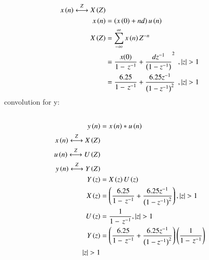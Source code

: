 \documentclass[journal,12pt,twocolumn]{IEEEtran}
\theoremstyle{remark}
\begin{document}
\begin{align}
x\brak{n}\overset{Z}{\longleftrightarrow}  X\brak{Z}
\\x\brak{n}&=\brak{x\brak{0}+nd}u\brak{n}
\\X\brak{Z}&=\sum_{-\infty}^{\infty}x\brak{n}Z^{-n}\
\\&=\frac{x(0)}{1-\,z^{-1}}+\frac{dz^{-1}}{\brak{1-{z^{-1}}}}^2\:\:,|z|>1
\\&=\frac{6.25}{1-\,z^{-1}}+\frac{6.25z^{-1}}{\brak{1-{z^{-1}}}^2}\:\:,|z|>1
\end{align}
convolution for y:
\begin{align}
\\y\brak{n}&=x\brak{n}*u\brak{n}
\\x\brak{n}\overset{Z}{\longleftrightarrow}  X\brak{Z}
\\u\brak{n}\overset{Z}{\longleftrightarrow}  U\brak{Z}
\\y\brak{n}\overset{Z}{\longleftrightarrow}  Y\brak{Z}
\\Y\brak{z}&=X\brak{z}U\brak{z}
\\X\brak{z}&=\brak{\frac{6.25}{1-\,z^{-1}}+\frac{6.25z^{-1}}{\brak{1-{z^{-1}}}^2}},|z|>1
\\U\brak{z}&=\frac{1}{1-\,z^{-1}},|z|>1
\\Y\brak{z}&=\brak{\frac{6.25}{1-\,z^{-1}}+\frac{6.25z^{-1}}{\brak{1-{z^{-1}}}^2}}\brak{\frac{1}{1-\,z^{-1}}}
\\|z|>1
\end{align}
 
\end{document}
